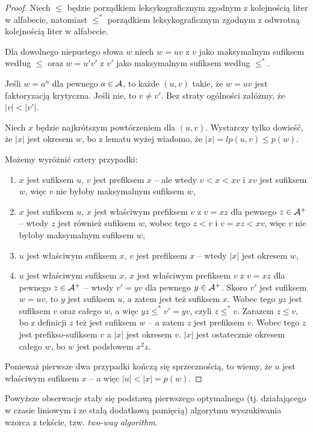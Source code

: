 \begin{proof}
  Niech $\le$ będzie porządkiem leksykograficznym zgodnym z kolejnością liter w alfabecie, natomiast $\le^*$ porządkiem leksykograficznym zgodnym z odwrotną kolejnością liter w alfabecie.

  Dla dowolnego niepustego słowa $w$ niech $w = uv$ z $v$ jako maksymalnym sufiksem według $\le$ oraz $w = u'v'$ z $v'$ jako maksymalnym sufiksem według $\le^*$.

  Jeśli $w = a^n$ dla pewnego $a \in \mathcal{A}$, to każde $(u, v)$ takie, że $w = uv$ jest faktoryzacją krytyczna.
  Jeśli nie, to $v \neq v'$. Bez straty ogólności załóżmy, że $|v| < |v'|$.

  Niech $x$ będzie najkrótszym powtórzeniem dla $(u, v)$.
  Wystarczy tylko dowieść, że $|x|$ jest okresem $w$, bo z lematu wyżej wiadomo, że $|x| = lp(u, v) \le p(w)$.

  Możemy wyróżnić cztery przypadki:
  \begin{enumerate}
    \item $x$ jest sufiksem $u$, $v$ jest prefiksem $x$ -- ale wtedy $v < x < xv$ i $xv$ jest sufiksem $w$, więc $v$ nie byłoby maksymalnym sufiksem $w$,
    \item $x$ jest sufiksem $u$, $x$ jest właściwym prefiksem $v$ z $v = xz$ dla pewnego $z \in \mathcal{A}^+$ -- wtedy $z$ jest również sufiksem $w$, wobec tego $z < v$ i $v = x z < x v$, więc $v$ nie byłoby maksymalnym sufiksem $w$,
    \item $u$ jest właściwym sufiksem $x$, $v$ jest prefiksem $x$ -- wtedy $|x|$ jest okresem $w$,
    \item $u$ jest właściwym sufiksem $x$, $x$ jest właściwym prefiksem $v$ z $v = x z$ dla pewnego $z \in \mathcal{A}^+$ -- wtedy $v' = y v$ dla pewnego $y \in \mathcal{A}^+$. Skoro $v'$ jest sufiksem $w = u v$, to $y$ jest sufiksem $u$, a zatem jest też sufiksem $x$. Wobec tego $y z$ jest sufiksem $v$ oraz całego $w$, a więc $y z \le^* v' = y v$, czyli $z \le^* v$. Zarazem $z \le v$, bo z definicji $z$ też jest sufiksem $w$ -- a zatem $z$ jest prefiksem $v$. Wobec tego $z$ jest prefikso-sufiksem $v$ a $|x|$ jest okresem $v$. $|x|$ jest ostatecznie okresem całego $w$, bo $w$ jest podsłowem $x^2 z$.
  \end{enumerate}

  Ponieważ pierwsze dwa przypadki kończą się sprzecznością, to wiemy, że $u$ jest właściwym sufiksem $x$ -- a więc $|u| < |x| = p(w)$.
\end{proof}

Powyższe obserwacje stały się podstawą pierwszego optymalnego (tj. działającego w czasie liniowym i ze stałą dodatkową pamięcią) algorytmu wyszukiwania wzorca z tekście, tzw. \emph{two-way algorithm}.

